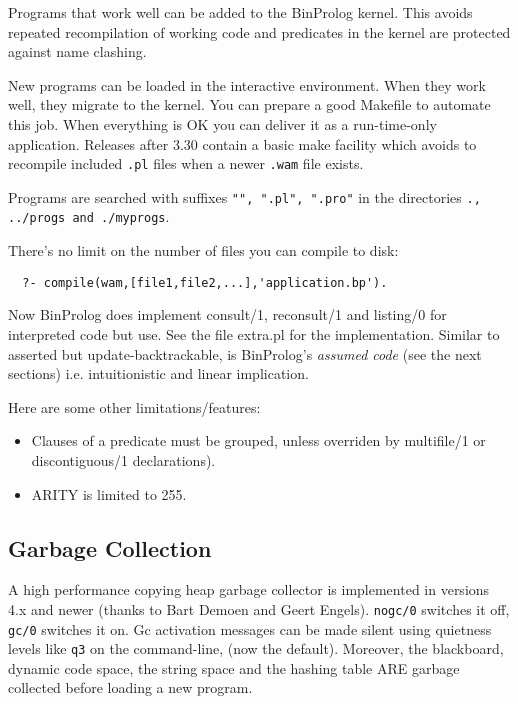 \documentclass{article}
\begin{document}
{\flushleft Programs} that work well can be added to the BinProlog kernel.
This avoids repeated recompilation of working code and predicates in the
kernel are protected against name clashing.

New programs can be loaded in the interactive environment.  When they
work well, they migrate to the kernel. You can prepare a good Makefile
to automate this job.  When everything is OK you can deliver it as a run-time-only application.
Releases after 3.30 contain a basic make facility which avoids
to recompile included {\tt *.pl} files when a newer {\tt *.wam} file exists.

Programs are searched with suffixes {\tt "", ".pl", ".pro"} in the directories
{\tt ., ../progs and ./myprogs}.

There's no limit on the number of files you can compile to disk:
\begin{verbatim}
  ?- compile(wam,[file1,file2,...],'application.bp').
\end{verbatim}

Now BinProlog does implement consult/1, reconsult/1 and listing/0 for
interpreted code but use.
See the file extra.pl for the implementation.
Similar to asserted but update-backtrackable, is BinProlog's {\em assumed code} (see the
next sections) i.e. intuitionistic and linear implication.

{\flushleft Here} are some other limitations/features:

\begin{itemize}
\item Clauses of a predicate must be grouped, unless overriden by multifile/1 or discontiguous/1 declarations).

\item ARITY is limited to 255.

\end{itemize}

\subsection{Garbage Collection}

A high performance copying heap garbage collector is implemented in versions 4.x and newer (thanks to
Bart Demoen and Geert Engels). {\tt nogc/0} switches it off,
{\tt gc/0} switches it on. Gc activation messages can be made
silent using quietness levels like {\tt \-q3} on the command-line,
(now the default).
Moreover, the blackboard, dynamic code space, the string space and the hashing table ARE garbage collected before loading a new program.
\end{document}
